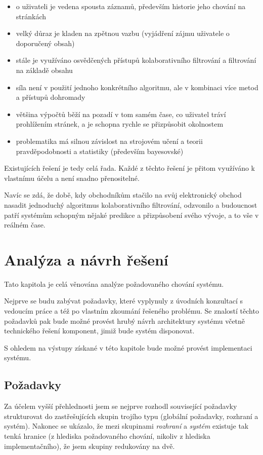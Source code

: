 \documentclass[thesis=M,czech]{FITthesis}[2014/05/07]
\begin{document}
\begin{itemize}
	\item o uživateli je vedena spousta záznamů, především historie jeho chování na stránkách
	\item velký důraz je kladen na zpětnou vazbu (vyjádření zájmu uživatele o doporučený obsah)
	\item stále je využíváno osvědčených přístupů kolaborativního filtrování a filtrování na základě obsahu
	\item síla není v použití jednoho konkrétního algoritmu, ale v kombinaci více metod a přístupů dohromady
	\item většina výpočtů běží na pozadí v tom samém čase, co uživatel tráví prohlížením stránek, a je schopna rychle se přizpůsobit okolnostem
	\item problematika má silnou závislost na strojovém učení a teorii pravděpodobnosti a statistiky (především bayesovské)
\end{itemize}

Existujících řešení je tedy celá řada. Každé z těchto řešení je přitom využíváno k vlastnímu účelu a není snadno přenositelné.

Navíc se zdá, že době, kdy obchodníkům stačilo na svůj elektronický obchod nasadit jednoduchý algoritmus kolaborativního filtrování, odzvonilo a budoucnost patří systémům schopným nějaké predikce a přizpůsobení svého vývoje, a to vše v reálném čase. 

\chapter{Analýza a návrh řešení}
\label{chap:analysis}

Tato kapitola je celá věnována analýze požadovaného chování systému.

Nejprve se budu zabývat požadavky, které vyplynuly z úvodních konzultací s vedoucím práce a též po vlastním zkoumání řešeného problému. Se znalostí těchto požadavků pak bude možné provést hrubý návrh architektury systému včetně technického řešení komponent, jimiž bude systém disponovat.

S ohledem na výstupy získané v této kapitole bude možné provést implementaci systému.

\section{Požadavky}

Za účelem vyšší přehlednosti jsem se nejprve rozhodl související požadavky strukturovat do zastřešujících skupin trojího typu (globální požadavky, rozhraní a systém). Nakonec se ukázalo, že mezi skupinami \emph{rozhraní} a \emph{systém} existuje tak tenká hranice (z hlediska požadovaného chování, nikoliv z hlediska implementačního), že jsem skupiny redukovány na dvě.
\end{document}
